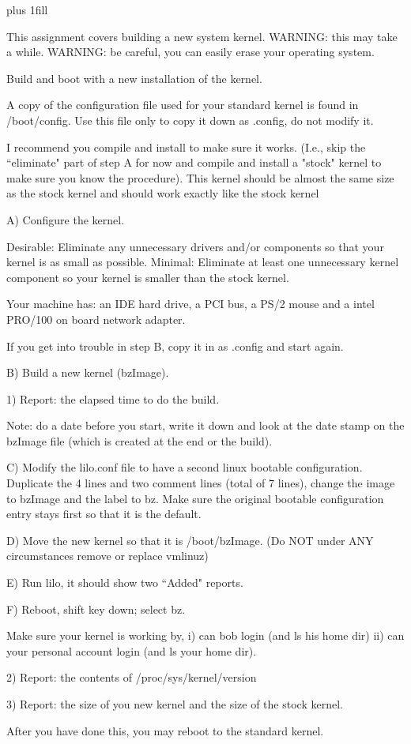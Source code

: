 
\rightskip=0pt plus 1fill

\parindent 0pt

This assignment covers building a new system kernel.
WARNING: this may take a while.
WARNING: be careful, you can easily erase your operating system.

Build and boot with a new installation of the kernel.

A copy of the configuration file used for your standard kernel
is found in {\ltt{}/boot/config}. Use this file only
to copy it down as {\ltt{}.config}, do not modify it.

I recommend you compile and install to make sure it works.
(I.e., skip the ``eliminate" part of step A for now and compile and
install a "stock" kernel to
make sure you know the procedure).
This kernel should be almost the same size as the stock kernel and should
work exactly like the stock kernel

A) Configure the kernel. 

Desirable:
Eliminate any unnecessary drivers and/or components so that your kernel is
as small as possible.
Minimal: Eliminate at least one unnecessary kernel component so your kernel
is smaller than the stock kernel.


Your machine has:
an IDE hard drive, a PCI bus, a PS/2 mouse
and
a intel PRO/100 on board network adapter.

If you get into trouble in step B, copy it in as {\ltt{}.config}
and start again.

B) Build a new kernel ({\ltt{}bzImage}).

1) Report: the elapsed time to do the build.

Note: do a date before you start, write it down and look at
the date stamp on the {\ltt{}bzImage} file (which is created at
the end or the build).

C) Modify the {\ltt{}lilo.conf} file to have a second linux
bootable configuration.
Duplicate the 4 lines and two comment lines (total of 7 lines),
change the image to {\ltt{}bzImage} and the label to {\ltt{}bz}.
Make sure the original bootable configuration entry stays first so that
it is the default.

D) Move the new kernel so that it is {\ltt{}/boot/bzImage}.
(Do NOT under ANY circumstances remove or replace {\ltt{}vmlinuz})

E) Run lilo, it should show two ``Added" reports.

F) Reboot, shift key down; select bz.

Make sure your kernel is working by,
i) can bob login (and ls his home dir)
ii) can your personal account login (and ls your home dir). 

2) Report: the contents of {\ltt{}/proc/sys/kernel/version} 

3) Report: the size of you new kernel and the size of the stock kernel.

After you have done this, you may reboot to the standard kernel.
\bye
